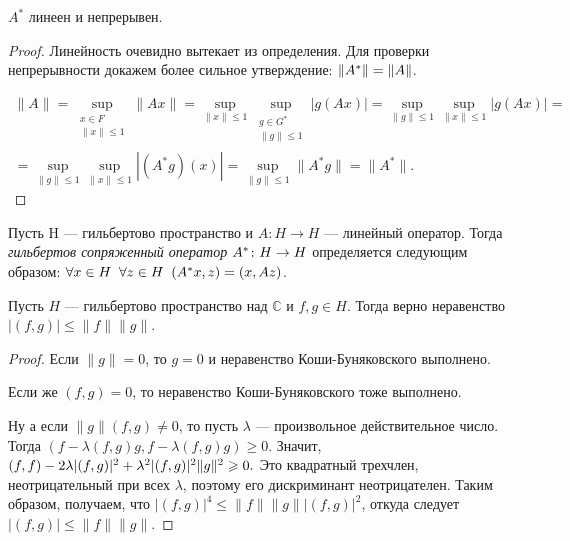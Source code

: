 \documentclass[10pt]{article}
\newcommand*{\p}[1]{#1\nobreak\discretionary{}{\hbox{$\mathsurround=0pt #1$}}{}}
\begin{document}
\begin{prop}
$A^*$ линеен и непрерывен.
\end{prop}

\begin{proof}
Линейность очевидно вытекает из определения. Для проверки
непрерывности докажем более сильное утверждение: $\|A^*\|\p=\|A\|$.

\begin{multline*}
\|A\|=\sup\limits_{\substack{x\in F\\ \|x\|\leqslant
1}}\|Ax\|=\sup\limits_{\|x\|\leqslant 1}\sup\limits_{\substack{g\in
G^*\\ \|g\|\leqslant 1}}|g(Ax)|=\sup\limits_{\|g\|\leqslant
1}\sup\limits_{\|x\|\leqslant 1}|g(Ax)|=\\
=\sup\limits_{\|g\|\leqslant 1}\sup\limits_{\|x\|\leqslant
1}|(A^*g)(x)|=\sup\limits_{\|g\|\leqslant 1}\|A^*g\|=\|A^*\|.
\end{multline*}
\end{proof}

\begin{df}
Пусть H --- гильбертово пространство и $A\colon H\rightarrow H$
--- линейный оператор. Тогда \emph{гильбертов сопряженный оператор}
$A^*\colon H\p\rightarrow H$ определяется следующим образом:
$\forall x\in H \;\;\forall z\in H \;\;(A^*x,z)\p=(x,Az)$.
\end{df}

\clearpage



\begin{theorem}\label{th.kompl.Koshi} Пусть $H$ --- гильбертово пространство
над $\mathbb{C}$ и $f,g\in H$. Тогда верно неравенство
$|(f,g)|\leqslant \|f\|\|g\|$.
\end{theorem}

\begin{proof}
Если $\|g\|=0$, то $g=0$ и неравенство Коши-Буняковс\-кого
выполнено.

Если же $(f,g)=0$, то неравенство Коши-Буняковского тоже выполнено.

Ну а если $\|g\|(f,g)\neq0$, то пусть $\lambda$ --- произвольное
действительное число. Тогда
$(f-\lambda(f,g)g,f-\lambda(f,g)g)\geqslant 0.$ Значит,
$(f,f)-2\lambda|(f,g)|^2\p+\lambda^2|(f,g)|^2\|g\|^2\geqslant0.$ Это
квадратный трехчлен, неотрицательный при всех $\lambda$, поэтому его
дискриминант неотрицателен. Таким образом, получаем, что
$|(f,g)|^4\leqslant \|f\|\|g\||(f,g)|^2$, откуда следует
$|(f,g)|\leqslant \|f\|\|g\|.$
\end{proof}
\end{document}
